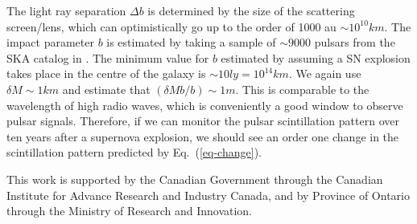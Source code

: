 \documentclass[aps,showpacs,twocolumn,floats,prd,superscriptaddress,nofootinbib]{revtex4-1}
\begin{document}
The light ray separation $\Delta b$ is determined by the size of the scattering screen/lens, which can optimistically go up to the order of 1000 au $\sim 10^{10} km$. The impact parameter $b$ is estimated by taking a sample of $\sim 9000$ pulsars from the SKA catalog in \cite{MSPpopulation}. The minimum value for $b$ estimated by assuming a SN explosion takes place in the centre of the galaxy is $\sim 10 ly = 10^{14} km$. We again use $\delta M \sim 1 km$ and estimate that $(\delta M b / b) \sim 1 m$. This is comparable to the wavelength of high radio waves, which is conveniently a good window to observe pulsar signals. Therefore, if we can monitor the pulsar scintillation pattern over ten years after a supernova explosion, we should see an order one change in the scintillation pattern predicted by Eq.~(\ref{eq-change}).
\ \\

\acknowledgments

This work is supported by the Canadian Government through the Canadian Institute for Advance Research and Industry Canada, and by Province of Ontario through the Ministry of Research and Innovation.

\end{document}
